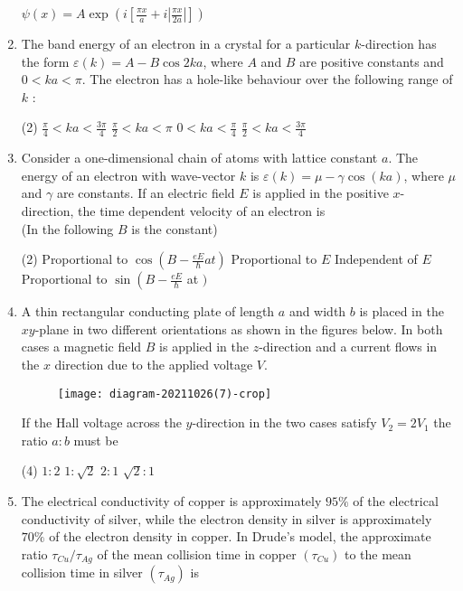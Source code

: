 \begin{enumerate}
\begin{tasks}
\task[\textbf{D.}] $\psi(x)=A \exp \left(i\left[\frac{\pi x}{a}+i\left|\frac{\pi x}{2 a}\right|\right]\right)$
\end{tasks}
	\item The band energy of an electron in a crystal for a particular $k$-direction has the form $\varepsilon(k)=A-B \cos 2 k a$, where $A$ and $B$ are positive constants and $0<k a<\pi$. The electron has a hole-like behaviour over the following range of $k$ :
	{}
\begin{tasks}(2)
\task[\textbf{A.}] $\frac{\pi}{4}<k a<\frac{3 \pi}{4}$
\task[\textbf{B.}] $\frac{\pi}{2}<k a<\pi$
\task[\textbf{C.}] $0<k a<\frac{\pi}{4}$
\task[\textbf{D.}] $\frac{\pi}{2}<k a<\frac{3 \pi}{4}$
\end{tasks}
	\item Consider a one-dimensional chain of atoms with lattice constant $a$. The energy of an electron with wave-vector $k$ is $\varepsilon(k)=\mu-\gamma \cos (k a)$, where $\mu$ and $\gamma$ are constants. If an electric field $E$ is applied in the positive $x$-direction, the time dependent velocity of an electron is\\
	(In the following $B$ is the constant)
	{}
\begin{tasks}(2)
\task[\textbf{A.}] Proportional to $\cos \left(B-\frac{e E}{\hbar} a t\right)$
\task[\textbf{B.}] Proportional to $E$
\task[\textbf{C.}] Independent of $E$
\task[\textbf{D.}] Proportional to $\sin \left(B-\frac{e E}{\hbar}\right.$ at $)$
\end{tasks}
	\item  A thin rectangular conducting plate of length $a$ and width $b$ is placed in the $x y$-plane in two different orientations as shown in the figures below. In both cases a magnetic field $B$ is applied in the $z$-direction and a current flows in the $x$ direction due to the applied voltage $V$.\\
	\begin{figure}[H]
		\centering
		\texttt{[image: diagram-20211026(7)-crop]}
	\end{figure}
	If the Hall voltage across the $y$-direction in the two cases satisfy $V_{2}=2 V_{1}$ the ratio $a: b$ must be
	{}
\begin{tasks}(4)
\task[\textbf{A.}]  $1: 2$
\task[\textbf{B.}] $1: \sqrt{2}$
\task[\textbf{C.}] $2: 1$
\task[\textbf{D.}] $\sqrt{2}: 1$
\end{tasks}
	\item The electrical conductivity of copper is approximately $95 \%$ of the electrical conductivity of silver, while the electron density in silver is approximately $70 \%$ of the electron density in copper. In Drude's model, the approximate ratio $\tau_{C u} / \tau_{A g}$ of the mean collision time in copper $\left(\tau_{C u}\right)$ to the mean collision time in silver $\left(\tau_{A g}\right)$ is

\end{enumerate}
